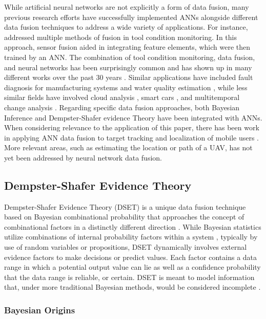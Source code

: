\documentclass[12pt]{uthesis-v12}  %
\begin{document}
While artificial neural networks are not explicitly a form of data fusion, many previous research efforts have successfully implemented ANNs alongside different data fusion techniques to address a wide variety of applications. 
For instance, \cite{chen2} addressed multiple methods of fusion in tool condition monitoring. 
In this approach, sensor fusion aided in integrating feature elements, which were then trained by an ANN.
The combination of tool condition monitoring, data fusion, and neural networks has been surprisingly common and has shown up in many different works over the past 30 years \cite{chen2, ghosh, dornfield}.
Similar applications have included fault diagnosis for manufacturing systems \cite{yuqin} and water quality estimation \cite{zhang}, while less similar fields have involved cloud analysis \cite{loyola}, smart cars \cite{nelson}, and multitemporal change analysis \cite{dai}.
Regarding specific data fusion approaches, both Bayesian Inference \cite{li} and Dempster-Shafer evidence Theory \cite{deno} have been integrated with ANNs.
When considering relevance to the application of this paper, there has been work in applying ANN data fusion to target tracking \cite{chin} and localization of mobile users \cite{meri}.
More relevant areas, such as estimating the location or path of a UAV, has not yet been addressed by neural network data fusion.


\subsection{Dempster-Shafer Evidence Theory}
\label{dset}

Dempster-Shafer Evidence Theory (DSET) is a unique data fusion technique based on Bayesian combinational probability that approaches the concept of combinational factors in a distinctly different direction \cite{nguyen}. 
While Bayesian statistics utilize combinations of internal probability factors within a system \cite{chiodo}, typically by use of random variables or propositions, DSET dynamically involves external evidence factors \cite{limbourg, lipeng} to make decisions or predict values. 
Each factor contains a data range in which a potential output value can lie as well as a confidence probability that the data range is reliable, or certain. 
DSET is meant to model information that, under more traditional Bayesian methods, would be considered incomplete \cite{nguyen}. 

\subsubsection{Bayesian Origins} 
\end{document}
